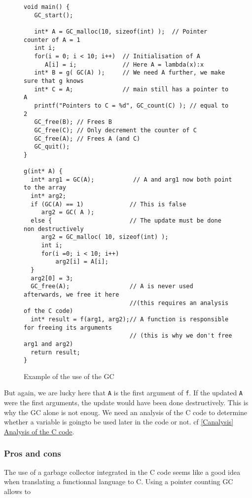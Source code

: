 \documentclass[12pt,a4paper]{article}
\newcommand{\cl}[1]{\texttt{#1}}
\begin{document}
\begin{figure}[!ht]
\begin{lstlisting}
void main() {
   GC_start();
   
   int* A = GC_malloc(10, sizeof(int) );  // Pointer counter of A = 1
   int i;
   for(i = 0; i < 10; i++)  // Initialisation of A
      A[i] = i;             // Here A = lambda(x):x
   int* B = g( GC(A) );     // We need A further, we make sure that g knows
   int* C = A;              // main still has a pointer to A
   printf("Pointers to C = %d", GC_count(C) ); // equal to 2
   GC_free(B); // Frees B
   GC_free(C); // Only decrement the counter of C
   GC_free(A); // Frees A (and C)
   GC_quit();
}

g(int* A) {
  int* arg1 = GC(A);           // A and arg1 now both point to the array
  int* arg2;
  if (GC(A) == 1)             // This is false
     arg2 = GC( A );
  else {                      // The update must be done non destructively
     arg2 = GC_malloc( 10, sizeof(int) );
     int i;
     for(i =0; i < 10; i++)
         arg2[i] = A[i];
  }  
  arg2[0] = 3;
  GC_free(A);                 // A is never used afterwards, we free it here
                              //(this requires an analysis of the C code)
  int* result = f(arg1, arg2);// A function is responsible for freeing its arguments
                              // (this is why we don't free arg1 and arg2)
  return result;
}
\end{lstlisting}
\caption{Example of the use of the GC}
\label{fig:exampleGC}
\end{figure}


But again, we are lucky here that \cl{A} is the first argument of \cl{f}. If the updated \cl{A} were the first arguments, the update would have been done destructively.
This is why the GC alone is not enoug. We need an analysis of the C code to determine whether a variable is goingto be used later in the code or not. cf \hyperref[Canalysis]{\ref*{Canalysis} Analysis of the C code}.


\subsubsection{Pros and cons}

The use of a garbage collector integrated in the C code seems like a good idea when translating a functionnal language to C. Using a pointer counting GC allows to 
\end{document}
